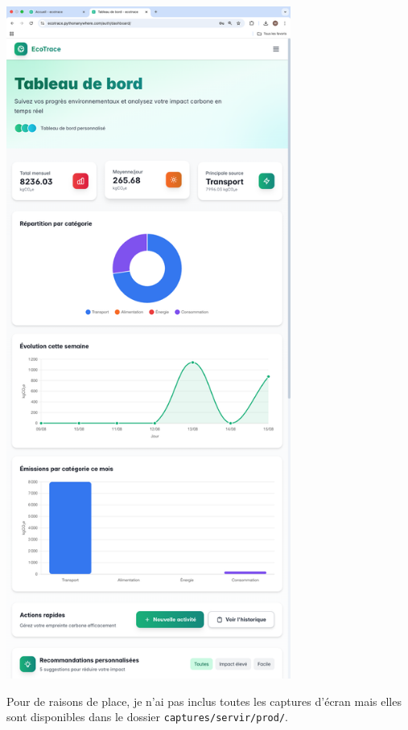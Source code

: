 \documentclass[a4paper,11pt]{article}
\begin{document}
\begin{enumerate}
\begin{center}
                            \includegraphics[width=0.7\textwidth]{captures/servir/prod/img5.png}
                        \end{center}

                        \noindent Pour de raisons de place, je n'ai pas inclus toutes les captures d'écran mais elles sont disponibles dans le dossier \texttt{captures/servir/prod/}.


\end{enumerate}
\end{document}

